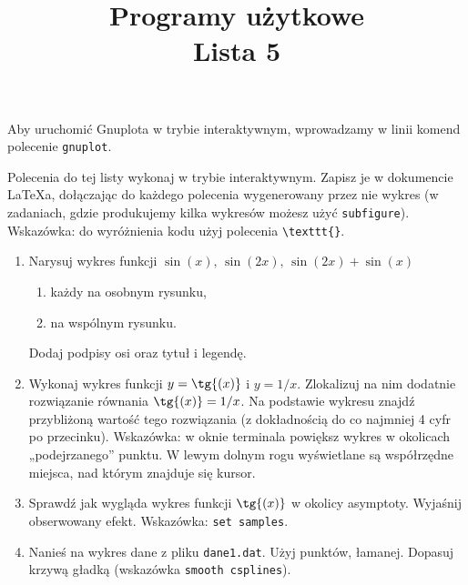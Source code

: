 \documentclass[12pt, letterpaper]{article}
\title{Programy użytkowe \\ Lista 5}
\date{}
\begin{document}
\maketitle
Aby uruchomić Gnuplota w trybie interaktywnym, wprowadzamy w linii komend polecenie \texttt{gnuplot}.

Polecenia do tej listy wykonaj w trybie interaktywnym. Zapisz je w dokumencie \LaTeX{a}, dołączając do każdego polecenia wygenerowany przez nie wykres (w zadaniach, gdzie produkujemy kilka wykresów możesz użyć \verb|subfigure|). Wskazówka: do wyróżnienia kodu użyj polecenia \verb|\texttt{}|.
\begin{enumerate}
    \item Narysuj wykres funkcji $\sin{(x)},\, \sin{(2x)},\,\sin{(2x)}+\sin{(x)}$
    \begin{enumerate}
        \item każdy na osobnym rysunku,
        \item na wspólnym rysunku.
    \end{enumerate}
    Dodaj podpisy osi oraz tytuł i legendę.
    \item Wykonaj wykres funkcji $y = \tg{(x)}$ i $y = 1/x$. Zlokalizuj na nim dodatnie rozwiązanie równania $\tg{(x)} = 1/x$. Na podstawie wykresu znajdź przybliżoną wartość tego rozwiązania (z dokładnością do co najmniej 4 cyfr po przecinku). Wskazówka: w oknie terminala powiększ wykres w okolicach „podejrzanego” punktu. W lewym dolnym rogu wyświetlane są współrzędne miejsca, nad którym znajduje się kursor.
    \item Sprawdź jak wygląda wykres funkcji $\tg{(x)}$ w okolicy asymptoty. Wyjaśnij obserwowany efekt. Wskazówka: \texttt{set samples}.
    \item Nanieś na wykres dane z pliku \texttt{dane1.dat}. Użyj punktów, łamanej. Dopasuj krzywą gładką (wskazówka \verb|smooth csplines|).
\end{enumerate}
\end{document}
